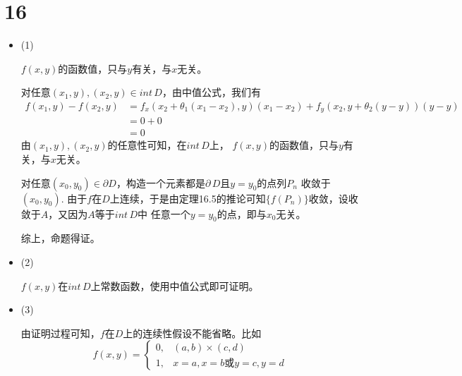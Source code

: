 \documentclass{article}
\begin{document}
\section*{16}

\begin{itemize}
  \item (1)

        $f(x, y)$的函数值，只与$y$有关，与$x$无关。

        对任意$(x_1, y), (x_2, y) \in int\, D$，由中值公式，我们有
        \begin{align*}
          f(x_1, y) - f(x_2, y)
           & = f_x(x_2 + \theta_1(x_1 - x_2), y) (x_1 - x_2) + f_y(x_2, y + \theta_2(y - y))(y - y) \\
           & = 0 + 0                                                                                \\
           & = 0
        \end{align*}
        由$(x_1, y), (x_2, y)$的任意性可知，在$int\, D$上，
        $f(x, y)$的函数值，只与$y$有关，与$x$无关。

        对任意$(x_0, y_0) \in \partial D$，构造一个元素都是$\partial\, D$且$y = y_0$的点列${P_n}$
        收敛于$(x_0, y_0)$.
        由于$f$在$D$上连续，于是由定理16.5的推论可知$\{f(P_n)\}$收敛，设收敛于$A$，又因为$A$等于$int\, D$中
        任意一个$y = y_0$的点，即与$x_0$无关。

        综上，命题得证。

  \item (2)

        $f(x, y)$在$int\, D$上常数函数，使用中值公式即可证明。

  \item (3)

        由证明过程可知，$f$在$D$上的连续性假设不能省略。比如
        \begin{equation*}
          f(x, y) =
          \begin{cases}
            0, & (a, b) \times (c, d)               \\
            1, & x = a, x = b \text{或} y = c, y = d
          \end{cases}
        \end{equation*}
\end{itemize}
\end{document}
